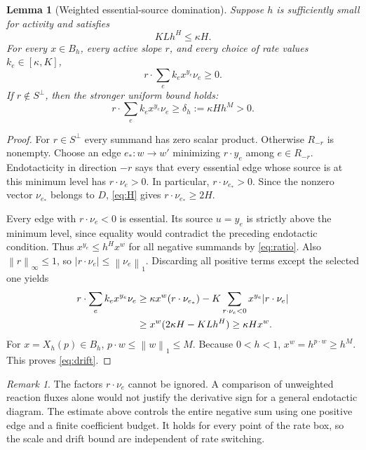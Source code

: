 \documentclass[11pt]{article}
\newtheorem{lemma}[theorem]{Lemma}
\theoremstyle{definition}
\theoremstyle{remark}
\newtheorem{remark}[theorem]{Remark}
\newcommand{\norm}[1]{\left\|#1\right\|}
\numberwithin{equation}{section}
\begin{document}
\begin{lemma}[Weighted essential-source domination]
\label{lem:drift}
Suppose $h$ is sufficiently small for activity and satisfies
\begin{equation}
 K L h^H\leq\kappa H.
 \label{eq:smallh}
\end{equation}
For every $x\in B_h$, every active slope $r$, and every choice of
rate values $k_e\in[\kappa,K]$,
\[
 r\cdot\sum_e k_e x^{y_e}\nu_e\geq0.
\]
If $r\notin S^\perp$, then the stronger uniform bound holds:
\begin{equation}
 r\cdot\sum_e k_e x^{y_e}\nu_e
       \geq\delta_h:=\kappa Hh^M>0.
 \label{eq:drift}
\end{equation}
\end{lemma}

\begin{proof}
For $r\in S^\perp$ every summand has zero scalar product.
Otherwise $R_{-r}$ is nonempty. Choose an edge
$e_*:w\to w'$ minimizing $r\cdot y_e$ among $e\in R_{-r}$.
Endotacticity in direction $-r$ says that every essential edge
whose source is at this minimum level has $r\cdot\nu_e>0$.
In particular, $r\cdot\nu_{e_*}>0$. Since the nonzero vector
$\nu_{e_*}$ belongs to $D$, \eqref{eq:H} gives
$r\cdot\nu_{e_*}\geq2H$.

Every edge with $r\cdot\nu_e<0$ is essential. Its source
$u=y_e$ is strictly above the minimum level, since equality
would contradict the preceding endotactic condition. Thus
$x^{y_e}\leq h^H x^w$ for all negative summands by
\eqref{eq:ratio}. Also $\norm{r}_\infty\leq1$, so
$|r\cdot\nu_e|\leq\norm{\nu_e}_1$. Discarding all positive
terms except the selected one yields
\begin{align}
 r\cdot\sum_e k_e x^{y_e}\nu_e
 &\geq\kappa x^w(r\cdot\nu_{e_*})
       -K\sum_{r\cdot\nu_e<0}x^{y_e}|r\cdot\nu_e| \notag\\
 &\geq x^w(2\kappa H-KLh^H)
 \geq\kappa Hx^w.\label{eq:weighted}
\end{align}
For $x=X_h(p)\in B_h$, $p\cdot w\leq\norm{w}_1\leq M$.
Because $0<h<1$,
$x^w=h^{p\cdot w}\geq h^M$. This proves \eqref{eq:drift}.
\end{proof}

\begin{remark}
The factors $r\cdot\nu_e$ cannot be ignored. A comparison of
unweighted reaction fluxes alone would not justify the derivative
sign for a general endotactic diagram. The estimate above controls
the entire negative sum using one positive edge and a finite
coefficient budget. It holds for every point of the rate box,
so the scale and drift bound are independent of rate switching.
\end{remark}
\end{document}

